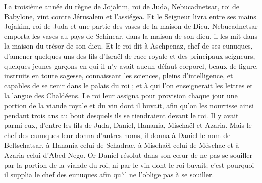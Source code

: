 \begin{multicols}{2}
\VerseOne{}La troisième année du règne de Jojakim, roi de Juda, Nebucadnetsar, roi de Babylone, vint contre Jérusalem et l'assiégea.
Et le Seigneur livra entre ses mains Jojakim, roi de Juda et une partie des vases de la maison de Dieu. Nebucadnetsar emporta les vases au pays de Schinear, dans la maison de son dieu, il les mit dans la maison du trésor de son dieu.
Et le roi dit à Aschpenaz, chef de ses eunuques, d'amener quelques-uns des fils d'Israël de race royale et des principaux seigneurs,
quelques jeunes garçons en qui il n'y avait aucun défaut corporel, beaux de figure, instruits en toute sagesse, connaissant les sciences, pleins d'intelligence, et capables de se tenir dans le palais du roi ; et à qui l'on enseignerait les lettres et la langue des Chaldéens.
Le roi leur assigna pour provision chaque jour une portion de la viande royale et du vin dont il buvait, afin qu'on les nourrisse ainsi pendant trois ans au bout desquels ils se tiendraient devant le roi.
Il y avait parmi eux, d'entre les fils de Juda, Daniel, Hanania, Mischaël et Azaria.
Mais le chef des eunuques leur donna d'autres noms, il donna à Daniel le nom de Beltschatsar, à Hanania celui de Schadrac, à Mischaël celui de Méschac et à Azaria celui d'Abed-Nego.
Or Daniel résolut dans son cœur de ne pas se souiller par la portion de la viande du roi, ni par le vin dont le roi buvait; c'est pourquoi il supplia le chef des eunuques afin qu'il ne l'oblige pas à se souiller.

\end{multicols}
